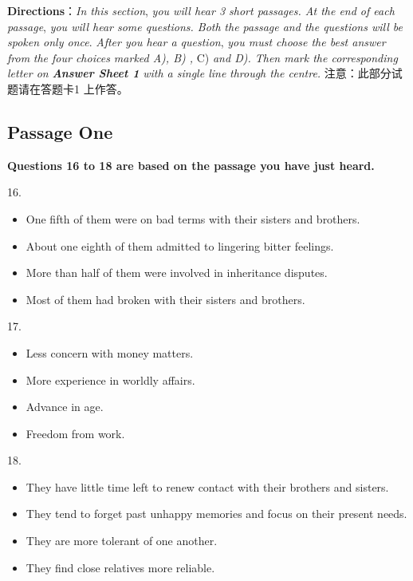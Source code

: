 \documentclass[UTF8,11pt]{ctexart}
\begin{document}
\textbf{Directions}：\textit{In this section},\textit{ you will hear 3 short passages. At the end of each passage},\textit{ you will hear some questions. Both} \textit{the passage and the questions will be spoken only once}.\textit{ After you hear a question},\textit{ you must choose the best answer from} \textit{the four choices marked A), B) ,} C)\textit{ and D). Then mark the corresponding letter on}\textbf{\textit{ Answer Sheet 1}}\textit{ with a single line} \textit{through the centre.} 注意：此部分试题请在答题卡1 上作答。


\subsection*{\textbf{Passage One}}


\textbf{Questions 16 to 18 are based on the passage you have just heard.}


16.


\begin{itemize}[leftmargin=2em,itemsep=.2em,topsep=.4em]\item[A.] One fifth of them were on bad terms with their sisters and brothers.
\item[B.] About one eighth of them admitted to lingering bitter feelings.
\item[C.] More than half of them were involved in inheritance disputes.
\item[D.] Most of them had broken with their sisters and brothers.
\end{itemize}

17.


\begin{itemize}[leftmargin=2em,itemsep=.2em,topsep=.4em]\item[A.] Less concern with money matters.
\item[B.] More experience in worldly affairs.
\item[C.] Advance in age.
\item[D.] Freedom from work.
\end{itemize}

18.


\begin{itemize}[leftmargin=2em,itemsep=.2em,topsep=.4em]\item[A.] They have little time left to renew contact with their brothers and sisters.
\item[B.] They tend to forget past unhappy memories and focus on their present needs.
\item[C.] They are more tolerant of one another.
\item[D.] They find close relatives more reliable.
\end{itemize}
\end{document}
